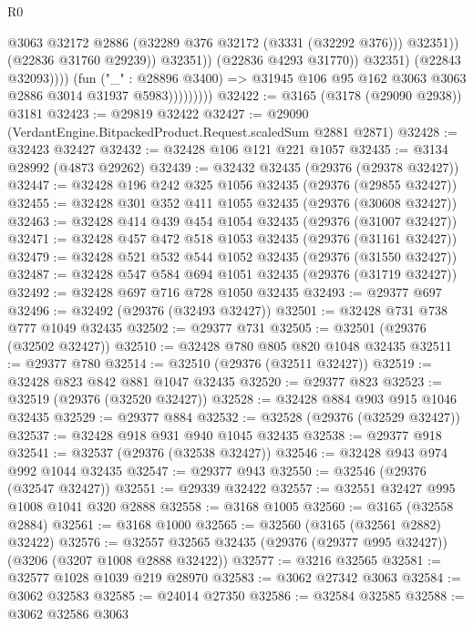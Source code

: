 \begin{lexlean}{R0}
\begin{coremodule}
                                        @3063
                                        @32172
                                        @2886
                                        (@32289 @376 @32172 (@3331 (@32292 @376)))
                                        @32351))
                                    (@22836 @31760 @29239))
                                  @32351))
                              (@22836 @4293 @31770))
                            @32351)
                          (@22843 @32093))))
                    (fun ("_" : @28896 @3400) =>
                    @31945 @106 @95 @162 @3063 @3063 @2886 @3014 @31937 @5983)))))))))
@32422 := @3165 (@3178 (@29090 @2938)) @3181
@32423 := @29819 @32422
@32427 := @29090 (VerdantEngine.BitpackedProduct.Request.scaledSum @2881 @2871)
@32428 := @32423 @32427
@32432 := @32428 @106 @121 @221 @1057
@32435 := @3134 @28992 (@4873 @29262)
@32439 := @32432 @32435 (@29376 (@29378 @32427))
@32447 := @32428 @196 @242 @325 @1056 @32435 (@29376 (@29855 @32427))
@32455 := @32428 @301 @352 @411 @1055 @32435 (@29376 (@30608 @32427))
@32463 := @32428 @414 @439 @454 @1054 @32435 (@29376 (@31007 @32427))
@32471 := @32428 @457 @472 @518 @1053 @32435 (@29376 (@31161 @32427))
@32479 := @32428 @521 @532 @544 @1052 @32435 (@29376 (@31550 @32427))
@32487 := @32428 @547 @584 @694 @1051 @32435 (@29376 (@31719 @32427))
@32492 := @32428 @697 @716 @728 @1050 @32435
@32493 := @29377 @697
@32496 := @32492 (@29376 (@32493 @32427))
@32501 := @32428 @731 @738 @777 @1049 @32435
@32502 := @29377 @731
@32505 := @32501 (@29376 (@32502 @32427))
@32510 := @32428 @780 @805 @820 @1048 @32435
@32511 := @29377 @780
@32514 := @32510 (@29376 (@32511 @32427))
@32519 := @32428 @823 @842 @881 @1047 @32435
@32520 := @29377 @823
@32523 := @32519 (@29376 (@32520 @32427))
@32528 := @32428 @884 @903 @915 @1046 @32435
@32529 := @29377 @884
@32532 := @32528 (@29376 (@32529 @32427))
@32537 := @32428 @918 @931 @940 @1045 @32435
@32538 := @29377 @918
@32541 := @32537 (@29376 (@32538 @32427))
@32546 := @32428 @943 @974 @992 @1044 @32435
@32547 := @29377 @943
@32550 := @32546 (@29376 (@32547 @32427))
@32551 := @29339 @32422
@32557 := @32551 @32427 @995 @1008 @1041 @320 @2888
@32558 := @3168 @1005
@32560 := @3165 (@32558 @2884)
@32561 := @3168 @1000
@32565 := @32560 (@3165 (@32561 @2882) @32422)
@32576 := @32557 @32565 @32435 (@29376 (@29377 @995 @32427)) (@3206 (@3207 @1008 @2888 @32422))
@32577 := @3216 @32565
@32581 := @32577 @1028 @1039 @219 @28970
@32583 := @3062 @27342 @3063
@32584 := @3062 @32583
@32585 := @24014 @27350
@32586 := @32584 @32585
@32588 := @3062 @32586 @3063

\end{coremodule}
\end{lexlean}
